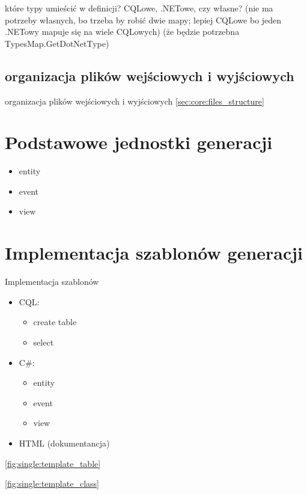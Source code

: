 które typy umieścić w definicji? CQLowe, .NETowe, czy własne? (nie ma potrzeby własnych, bo trzeba by robić dwie mapy; lepiej CQLowe bo jeden .NETowy mapuje się na wiele CQLowych) (że będzie potrzebna TypesMap.GetDotNetType)


\subsection{organizacja plików wejściowych i wyjściowych}

organizacja plików wejściowych i wyjściowych \ref{sec:core:files_structure}



\section{Podstawowe jednostki generacji}

\begin{itemize}
 \item entity
 \item event
 \item view
\end{itemize}



\section{Implementacja szablonów generacji}

Implementacja szablonów

\begin{itemize}
 \item CQL:
  \begin{itemize}
   \item create table
   \item select
  \end{itemize}
 \item C\#:
  \begin{itemize}
   \item entity
   \item event
   \item view
  \end{itemize}
 \item HTML (dokumentancja)
\end{itemize}

\ref{fig:single:template_table}


\ref{fig:single:template_class}


